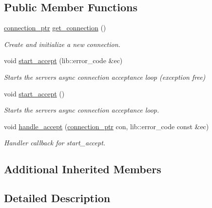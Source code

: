 \subsection*{Public Member Functions}
\begin{DoxyCompactItemize}
\item 
\hyperlink{classwebsocketpp_1_1server_a0b93f09ceae3d1dafd2f7b1da759c2ad}{connection\+\_\+ptr} \hyperlink{classwebsocketpp_1_1server_a9146c63ed1afb5bdec29eca52c487226}{get\+\_\+connection} ()
\begin{DoxyCompactList}\small\item\em Create and initialize a new connection. \end{DoxyCompactList}\item 
void \hyperlink{classwebsocketpp_1_1server_a0204a7d444144f7ea5b8bbcf14689fc1}{start\+\_\+accept} (lib\+::error\+\_\+code \&ec)
\begin{DoxyCompactList}\small\item\em Starts the server\textquotesingle{}s async connection acceptance loop (exception free) \end{DoxyCompactList}\item 
void \hyperlink{classwebsocketpp_1_1server_ab61bcdf9fd532fe7ebd934f8d84fdfea}{start\+\_\+accept} ()
\begin{DoxyCompactList}\small\item\em Starts the server\textquotesingle{}s async connection acceptance loop. \end{DoxyCompactList}\item 
void \hyperlink{classwebsocketpp_1_1server_aa24feb1c5d2bde47de8b11f5369c54d4}{handle\+\_\+accept} (\hyperlink{classwebsocketpp_1_1server_a0b93f09ceae3d1dafd2f7b1da759c2ad}{connection\+\_\+ptr} con, lib\+::error\+\_\+code const \&ec)\hypertarget{classwebsocketpp_1_1server_aa24feb1c5d2bde47de8b11f5369c54d4}{}\label{classwebsocketpp_1_1server_aa24feb1c5d2bde47de8b11f5369c54d4}

\begin{DoxyCompactList}\small\item\em Handler callback for start\+\_\+accept. \end{DoxyCompactList}\end{DoxyCompactItemize}
\subsection*{Additional Inherited Members}


\subsection{Detailed Description}
